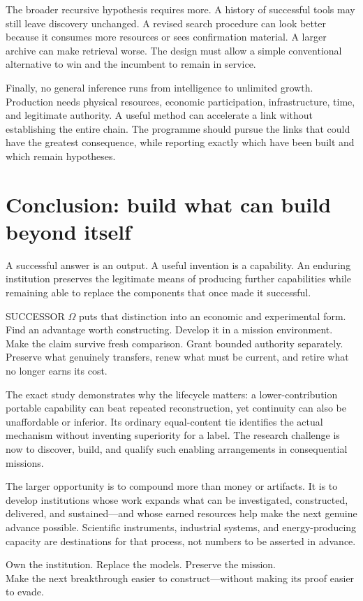 The broader recursive hypothesis requires more. A history of successful tools may still leave discovery unchanged. A revised search procedure can look better because it consumes more resources or sees confirmation material. A larger archive can make retrieval worse. The design must allow a simple conventional alternative to win and the incumbent to remain in service.

Finally, no general inference runs from intelligence to unlimited growth. Production needs physical resources, economic participation, infrastructure, time, and legitimate authority. A useful method can accelerate a link without establishing the entire chain. The programme should pursue the links that could have the greatest consequence, while reporting exactly which have been built and which remain hypotheses.

\section{Conclusion: build what can build beyond itself}
\label{sec:conclusion}
A successful answer is an output. A useful invention is a capability. An enduring institution preserves the legitimate means of producing further capabilities while remaining able to replace the components that once made it successful.

SUCCESSOR $\Omega$ puts that distinction into an economic and experimental form. Find an advantage worth constructing. Develop it in a mission environment. Make the claim survive fresh comparison. Grant bounded authority separately. Preserve what genuinely transfers, renew what must be current, and retire what no longer earns its cost.

The exact study demonstrates why the lifecycle matters: a lower-contribution portable capability can beat repeated reconstruction, yet continuity can also be unaffordable or inferior. Its ordinary equal-content tie identifies the actual mechanism without inventing superiority for a label. The research challenge is now to discover, build, and qualify such enabling arrangements in consequential missions.

The larger opportunity is to compound more than money or artifacts. It is to develop institutions whose work expands what can be investigated, constructed, delivered, and sustained---and whose earned resources help make the next genuine advance possible. Scientific instruments, industrial systems, and energy-producing capacity are destinations for that process, not numbers to be asserted in advance.

\begin{insight}
Own the institution. Replace the models. Preserve the mission.\\[3pt]
Make the next breakthrough easier to construct---without making its proof easier to evade.
\end{insight}
